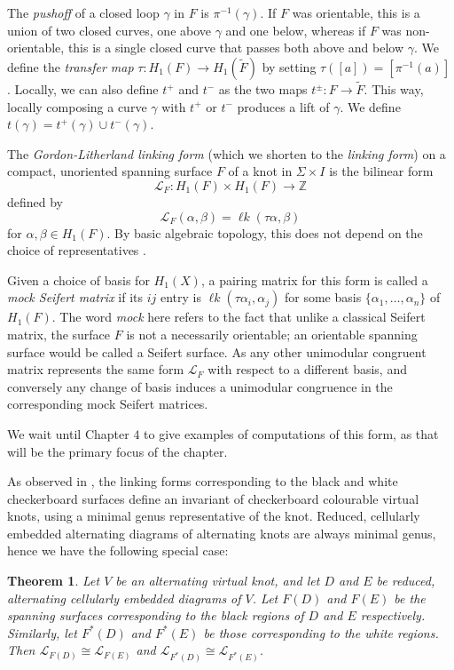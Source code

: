 \documentclass[12pt]{report}
\newcommand{\Z}{\mathbb{Z}}
\newcommand{\lk}{\operatorname{\ell\textit{k}}}
\newtheorem*{theorem}{Theorem}
\theoremstyle{upright}
\begin{document}
The \textit{pushoff} of a closed loop $\gamma$ in $F$ is $\pi^{-1}(\gamma)$. If $F$ was orientable, this is a union of two closed curves, one above $\gamma$ and one below, whereas if $F$ was non-orientable, this is a single closed curve that passes both above and below $\gamma$. We define the \textit{transfer map} $\tau: H_{1}(F) \longrightarrow H_{1}(\widetilde{F})$ by setting $\tau([a]) = [\pi^{-1}(a)]$. Locally, we can also define $t^{+}$ and $t^{-}$ as the two maps $t^{\pm}: F \longrightarrow \widetilde{F}$. This way, locally composing a curve $\gamma$ with $t^{+}$ or $t^{-}$ produces a lift of $\gamma$. We define $t(\gamma) = t^{+}(\gamma) \cup t^{-}(\gamma)$.


The \textit{Gordon-Litherland linking form} (which we shorten to the \textit{linking form}) on a compact, unoriented spanning surface $F$ of a knot in $\Sigma \times I$ is the bilinear form
\[\mathcal{L}_{F}: H_{1}(F) \times H_{1}(F) \longrightarrow \Z\]
defined by
\[\mathcal{L}_{F}(\alpha, \beta) = \lk(\tau\alpha, \beta)\]
for $\alpha, \beta \in H_{1}(F)$. By basic algebraic topology, this does not depend on the choice of representatives \cite[Chapter 2]{alternating-links-thickened-surfaces}. 

Given a choice of basis for $H_{1}(X)$, a pairing matrix for this form is called a \textit{mock Seifert matrix} if its $ij$ entry is $\lk(\tau \alpha_{i}, \alpha_{j})$ for some basis $\{\alpha_{1}, \dots, \alpha_{n}\}$ of $H_{1}(F)$. The word \textit{mock} here refers to the fact that unlike a classical Seifert matrix, the surface $F$ is not a necessarily orientable; an orientable spanning surface would be called a Seifert surface. As any other unimodular congruent matrix represents the same form $\mathcal{L}_{F}$ with respect to a different basis, and conversely any change of basis induces a unimodular congruence in the corresponding mock Seifert matrices.

We wait until Chapter $4$ to give examples of computations of this form, as that will be the primary focus of the chapter.

As observed in \cite[Section 3]{gordon-litherland-pairing-thickened-surfaces}, the linking forms corresponding to the black and white checkerboard surfaces define an invariant of checkerboard colourable virtual knots, using a minimal genus representative of the knot. Reduced, cellularly embedded alternating diagrams of alternating knots are always minimal genus, hence we have the following special case:

\begin{theorem}
Let $V$ be an alternating virtual knot, and let $D$ and $E$ be reduced, alternating cellularly embedded diagrams of $V$. Let $F(D)$ and $F(E)$ be the spanning surfaces corresponding to the black regions of $D$ and $E$ respectively. Similarly, let $F^{*}(D)$ and $F^{*}(E)$ be those corresponding to the white regions. Then $\mathcal{L}_{F(D)} \cong \mathcal{L}_{F(E)}$ and $\mathcal{L}_{F^{*}(D)} \cong \mathcal{L}_{F^{*}(E)}$.
\end{theorem}
\end{document}
